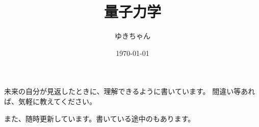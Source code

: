 \documentclass[dvipdfmx,a4paper,16pt]{jsarticle}
\title{量子力学}
\author{ゆきちゃん}
\date{\today}
\begin{document}
\maketitle

未来の自分が見返したときに、理解できるように書いています。
間違い等あれば、気軽に教えてください。

また、随時更新しています。書いている途中のもあります。

\tableofcontents

\newpage

% 

% 

\nocite{*}                 %
























\end{document}
